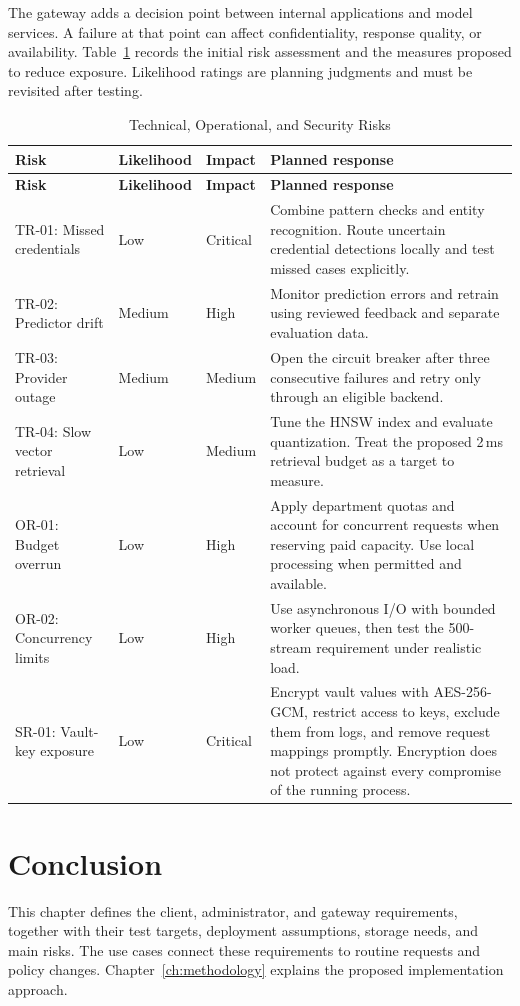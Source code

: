 The gateway adds a decision point between internal applications and model services. A failure at that point can affect confidentiality, response quality, or availability. Table~\ref{tab:risk_analysis} records the initial risk assessment and the measures proposed to reduce exposure. Likelihood ratings are planning judgments and must be revisited after testing.
\begingroup
\small
{}
\setlength{\parskip}{0pt}
\setlength{\tabcolsep}{4pt}
\begin{longtable}{|>{\raggedright\arraybackslash}p{3.6cm}|>{\raggedright\arraybackslash}p{1.6cm}|>{\raggedright\arraybackslash}p{1.5cm}|>{\raggedright\arraybackslash}p{7.9cm}|}
\caption{Technical, Operational, and Security Risks}\label{tab:risk_analysis}\\
\hline
\textbf{Risk} & \textbf{Likelihood} & \textbf{Impact} & \textbf{Planned response} \\ \hline
\endfirsthead
\hline
\textbf{Risk} & \textbf{Likelihood} & \textbf{Impact} & \textbf{Planned response} \\ \hline
\endhead
TR-01: Missed credentials & Low & Critical & Combine pattern checks and entity recognition. Route uncertain credential detections locally and test missed cases explicitly. \\ \hline
TR-02: Predictor drift & Medium & High & Monitor prediction errors and retrain using reviewed feedback and separate evaluation data. \\ \hline
TR-03: Provider outage & Medium & Medium & Open the circuit breaker after three consecutive failures and retry only through an eligible backend. \\ \hline
TR-04: Slow vector retrieval & Low & Medium & Tune the HNSW index and evaluate quantization. Treat the proposed 2\,ms retrieval budget as a target to measure. \\ \hline
OR-01: Budget overrun & Low & High & Apply department quotas and account for concurrent requests when reserving paid capacity. Use local processing when permitted and available. \\ \hline
OR-02: Concurrency limits & Low & High & Use asynchronous I/O with bounded worker queues, then test the 500-stream requirement under realistic load. \\ \hline
SR-01: Vault-key exposure & Low & Critical & Encrypt vault values with AES-256-GCM, restrict access to keys, exclude them from logs, and remove request mappings promptly. Encryption does not protect against every compromise of the running process. \\ \hline
\end{longtable}
\endgroup

\section{Conclusion}
\label{sec:ch4-conclusion}

This chapter defines the client, administrator, and gateway requirements, together with their test targets, deployment assumptions, storage needs, and main risks. The use cases connect these requirements to routine requests and policy changes. Chapter~\ref{ch:methodology} explains the proposed implementation approach.
\clearpage
